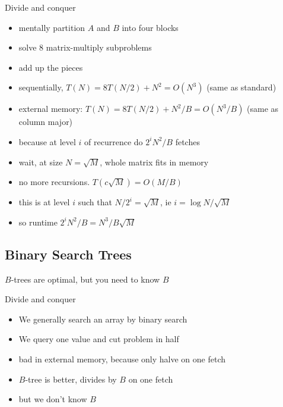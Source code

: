 \documentclass{article}
\begin{document}
Divide and conquer
\begin{itemize}
\item mentally partition $A$ and $B$ into four blocks
\item solve 8 matrix-multiply subproblems
\item add up the pieces
\item sequentially, $T(N)=8T(N/2) + N^2 = O(N^3)$ (same as standard)
\item external memory: $T(N)=8T(N/2) + N^2/B = O(N^3/B)$ (same as
  column major)
\item because at level $i$ of recurrence do $2^iN^2/B$ fetches
\item wait, at size $N=\sqrt{M}$, whole matrix fits in memory
\item no more recursions.  $T(c\sqrt{M}) = O(M/B)$
\item this is at level $i$ such that $N/2^i = \sqrt{M}$, ie $i=\log
  N/\sqrt{M}$
\item so runtime $2^iN^2/B= N^3/B\sqrt{M}$
\end{itemize}

\subsection*{Binary Search Trees}

$B$-trees are optimal, but you need to know $B$

Divide and conquer
\begin{itemize}
\item We generally search an array by binary search
\item We query one value and cut problem in half
\item bad in external memory, because only halve on one fetch
\item $B$-tree is better, divides by $B$ on one fetch
\item but we don't know $B$
\end{itemize}
\end{document}
